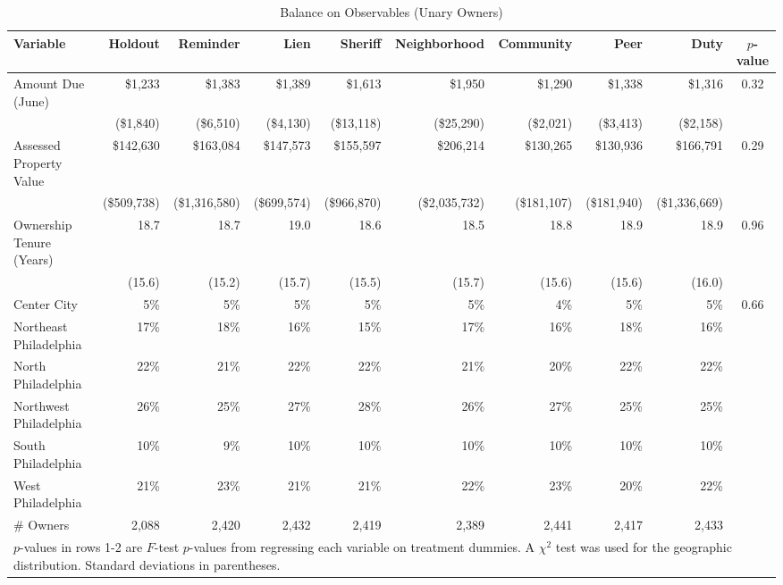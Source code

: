 \begin{sidewaystable}[ht]
\centering
\caption{Balance on Observables (Unary Owners)}
\label{balance}
\vspace{10mm}
\begin{tabular}{lrrrrrrrrc}
\hline
  \hline
Variable & Holdout & Reminder & Lien & Sheriff & Neighborhood & Community & Peer & Duty & $p$-value \\ 
   \hline
Amount Due (June) & \$1,233 & \$1,383 & \$1,389 & \$1,613 & \$1,950 & \$1,290 & \$1,338 & \$1,316 & 0.32 \\ 
   & (\$1,840) & (\$6,510) & (\$4,130) & (\$13,118) & (\$25,290) & (\$2,021) & (\$3,413) & (\$2,158) &  \\ 
  Assessed Property Value & \$142,630 & \$163,084 & \$147,573 & \$155,597 & \$206,214 & \$130,265 & \$130,936 & \$166,791 & 0.29 \\ 
   & (\$509,738) & (\$1,316,580) & (\$699,574) & (\$966,870) & (\$2,035,732) & (\$181,107) & (\$181,940) & (\$1,336,669) &  \\ 
  Ownership Tenure (Years) & 18.7 & 18.7 & 19.0 & 18.6 & 18.5 & 18.8 & 18.9 & 18.9 & 0.96 \\ 
   & (15.6) & (15.2) & (15.7) & (15.5) & (15.7) & (15.6) & (15.6) & (16.0) &  \\ 
  Center City & 5\% & 5\% & 5\% & 5\% & 5\% & 4\% & 5\% & 5\% & 0.66 \\ 
  Northeast Philadelphia & 17\% & 18\% & 16\% & 15\% & 17\% & 16\% & 18\% & 16\% &  \\ 
  North Philadelphia & 22\% & 21\% & 22\% & 22\% & 21\% & 20\% & 22\% & 22\% &  \\ 
  Northwest Philadelphia & 26\% & 25\% & 27\% & 28\% & 26\% & 27\% & 25\% & 25\% &  \\ 
  South Philadelphia & 10\% &  9\% & 10\% & 10\% & 10\% & 10\% & 10\% & 10\% &  \\ 
  West Philadelphia & 21\% & 23\% & 21\% & 21\% & 22\% & 23\% & 20\% & 22\% &  \\ 
  \# Owners & 2,088 & 2,420 & 2,432 & 2,419 & 2,389 & 2,441 & 2,417 & 2,433 &  \\ 
  \hline
\multicolumn{10}{l}{\scriptsize{$p$-values in rows 1-2 are $F$-test $p$-values from regressing each variable on treatment dummies. A $\chi^2$ test was used for the geographic distribution. Standard deviations in parentheses.}} \\
\end{tabular}
\end{sidewaystable}

